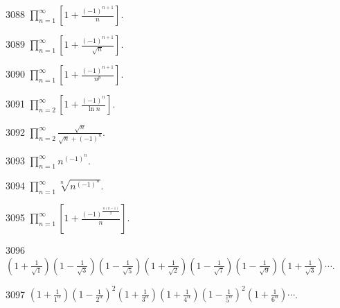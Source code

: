 
\begin{prob}[S]{3088}
$\displaystyle \prod_{n=1}^{\infty} \left[1 + \frac{(-1)^{n+1}}{n}\right]$.
\end{prob}

\begin{prob}[S]{3089}
$\displaystyle \prod_{n=1}^{\infty} \left[1 + \frac{(-1)^{n+1}}{\sqrt{n}}\right]$.
\end{prob}

\begin{prob}[S]{3090}
$\displaystyle \prod_{n=1}^{\infty} \left[1 + \frac{(-1)^{n+1}}{n^{p}}\right]$.
\end{prob}

\begin{prob}[S]{3091}
$\displaystyle \prod_{n=2}^{\infty} \left[1 + \frac{(-1)^{n}}{\ln n}\right]$.
\end{prob}

\begin{prob}[S]{3092}
$\displaystyle \prod_{n=2}^{\infty} \frac{\sqrt{n}}{\sqrt{n} + (-1)^{n}}$.
\end{prob}

\begin{prob}[S]{3093}
$\displaystyle \prod_{n=1}^{\infty} n^{(-1)^{n}}$.
\end{prob}

\begin{prob}[S]{3094}
$\displaystyle \prod_{n=1}^{\infty} \sqrt[n]{n^{(-1)^{n}}}$.
\end{prob}

\begin{prob}[S]{3095}
$\displaystyle \prod_{n=1}^{\infty} \left[1 + \frac{(-1)^{\frac{n(n-1)}{2}}}{n}\right]$.
\end{prob}

\begin{prob}[M]{3096}
$\displaystyle \left(1 + \frac{1}{\sqrt{1}}\right)\left(1 - \frac{1}{\sqrt{3}}\right)\left(1 - \frac{1}{\sqrt{5}}\right)\left(1 + \frac{1}{\sqrt{2}}\right)\left(1 - \frac{1}{\sqrt{7}}\right)\left(1 - \frac{1}{\sqrt{9}}\right)\left(1 + \frac{1}{\sqrt{3}}\right)\cdots$.
\end{prob}

\begin{prob}[M]{3097}
$\displaystyle \left(1 + \frac{1}{1^{\alpha}}\right)\left(1 - \frac{1}{2^{\alpha}}\right)^{2}\left(1 + \frac{1}{3^{\alpha}}\right)\left(1 + \frac{1}{4^{\alpha}}\right)\left(1 - \frac{1}{5^{\alpha}}\right)^{2}\left(1 + \frac{1}{6^{\alpha}}\right)\cdots$.
\end{prob}

